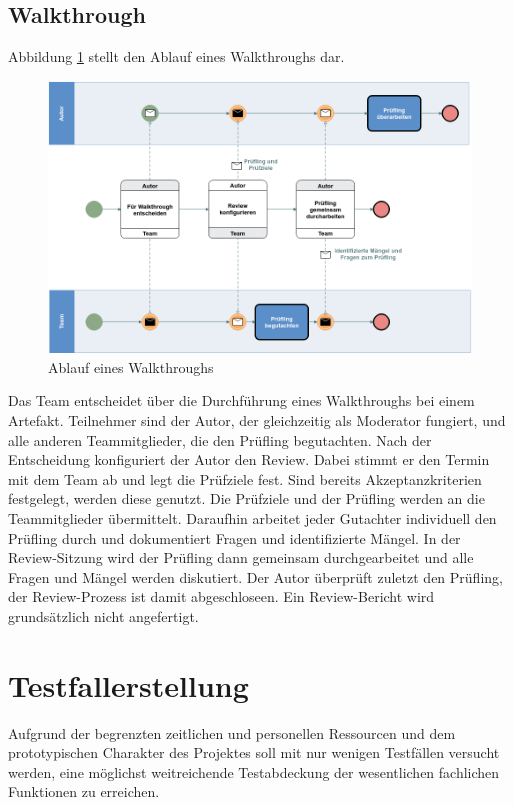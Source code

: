 \documentclass[a4paper,11pt,listof=numbered,glossary=totoc,parskip=half,toc=bib]{scrreprt}
\begin{document}
\subsection{Walkthrough}
Abbildung \ref{fig:walkthrough} stellt den Ablauf eines Walkthroughs dar.
	\begin{figure}
		\centering
		\includegraphics[width=\textwidth]{walkthrough.png}
		\caption{Ablauf eines Walkthroughs}
		\label{fig:walkthrough}
	\end{figure}
Das Team entscheidet über die Durchführung eines Walkthroughs bei einem Artefakt. Teilnehmer sind der Autor, der gleichzeitig als Moderator fungiert, und alle anderen Teammitglieder, die den Prüfling begutachten. Nach der Entscheidung konfiguriert der Autor den Review. Dabei stimmt er den Termin mit dem Team ab und legt die Prüfziele fest. Sind bereits Akzeptanzkriterien festgelegt, werden diese genutzt. Die Prüfziele und der Prüfling werden an die Teammitglieder übermittelt. Daraufhin arbeitet jeder Gutachter individuell den Prüfling durch und dokumentiert Fragen und identifizierte Mängel. In der Review-Sitzung wird der Prüfling dann gemeinsam durchgearbeitet und alle Fragen und Mängel werden diskutiert. Der Autor überprüft zuletzt den Prüfling, der Review-Prozess ist damit abgeschloseen. Ein Review-Bericht wird grundsätzlich nicht angefertigt.
	
\section{Testfallerstellung}
	Aufgrund der begrenzten zeitlichen und personellen Ressourcen und dem prototypischen Charakter des Projektes soll mit nur wenigen Testfällen versucht werden, eine möglichst weitreichende Testabdeckung der wesentlichen fachlichen Funktionen zu erreichen.
	
\end{document}
